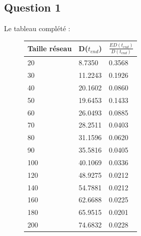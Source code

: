 \documentclass[10pt]{report}
\begin{document}
\subsection{Question 1}

Le tableau complété :
\begin{figure}[h]
\begin{minipage}[b]{0.4\textwidth} \begin{flushleft}
\centering
\begin{tabular}{|l|l|l|} \hline
  	Taille réseau & D($t_{end}$) & $\frac{ED(t_{end})}{D(t_{end})}$\\ \hline
	20 & 8.7350 & 0.3568\\ \hline
  	30 & 11.2243 & 0.1926\\ \hline
  	40 & 20.1602 & 0.0860\\ \hline
  	50 & 19.6453 & 0.1433\\ \hline
  	60 & 26.0493 & 0.0885\\ \hline
  	70 & 28.2511 & 0.0403\\ \hline
    80 & 31.1596 & 0.0620\\ \hline
  	90 & 35.5816 & 0.0405\\ \hline
  	100 & 40.1069 & 0.0336\\ \hline
  	120 & 48.9275 & 0.0212\\ \hline
  	140 & 54.7881 & 0.0212\\ \hline
  	160 & 62.6688 & 0.0225\\ \hline
  	180 & 65.9515 & 0.0201\\ \hline
  	200 & 74.6832 & 0.0228\\ \hline
\end{tabular}
\end{flushleft}\end{minipage}
%
\begin{minipage}{0.6\textwidth} \begin{flushright}
\vspace{-7cm}
\centering
{}
\end{flushright}
\end{minipage}
\end{figure}
\end{document}
